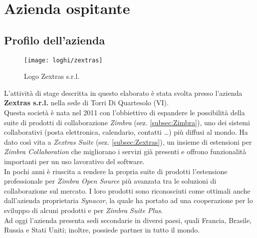 \chapter{Azienda ospitante}\label{chap:company}

\section{Profilo dell'azienda}
\vspace{1cm}
\begin{figure}[H] 
	\centering
	\texttt{[image: loghi/zextras]}
	\caption{Logo Zextras s.r.l.}
	\label{fig:logoZextras}
\end{figure}
\vspace{1cm}
L'attività di stage descritta in questo elaborato è stata svolta presso l'azienda \textbf{Zextras s.r.l.} nella sede di Torri Di Quartesolo (VI). \\
Questa società è nata nel 2011 con l'obbiettivo di espandere le possibilità della suite di prodotti di collaborazione \emph{Zimbra} (sez. \ref{subsec:Zimbra}), uno dei sistemi collaborativi (posta elettronica, calendario, contatti …) più diffusi al mondo. Ha dato così vita a \emph{Zextras Suite} (sez. \ref{subsec:Zextras}), un insieme di estensioni per \emph{Zimbra Collaboration} che migliorano i servizi già presenti e offrono funzionalità importanti per un uso lavorativo del software.\\
In pochi anni è riuscita a rendere la propria suite di prodotti l'estensione professionale per \emph{Zimbra Open Source} più avanzata tra le soluzioni di collaborazione sul mercato. I loro prodotti sono riconosciuti come ottimali anche dall'azienda proprietaria \emph{Synacor}, la quale ha portato ad una cooperazione per lo sviluppo di alcuni prodotti  e per \emph{Zimbra Suite Plus}.\\
Ad oggi l'azienda presenta sedi secondarie in diversi paesi, quali Francia, Brasile, Russia e Stati Uniti;  inoltre, possiede partner in tutto il mondo.\\

\newpage
